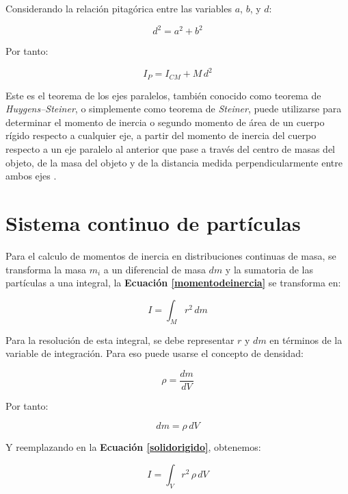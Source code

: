 \documentclass[letter,twoside,11pt]{article}
\begin{document}
Considerando la relación pitagórica entre las variables $a$, $b$, y $d$:

\begin{equation*}
    d^2 = a^2 + b^2
\end{equation*}

Por tanto:

\begin{equation}
    I_{P} = I_{CM} + M\, d^2
\end{equation}

Este es el teorema de los ejes paralelos, también conocido como teorema de 
\emph{Huygens–Steiner}, o simplemente como teorema de \emph{Steiner}, puede
utilizarse para determinar el momento de inercia o segundo momento de área de
un cuerpo rígido respecto a cualquier eje, a partir del momento de inercia del
cuerpo respecto a un eje paralelo al anterior que pase a través del centro de
masas del objeto, de la masa del objeto y de la distancia medida
perpendicularmente entre ambos ejes \cite{WIKI1}.

\section{Sistema continuo de partículas \cite{Sears}}

Para el calculo de momentos de inercia en distribuciones continuas de masa, se
transforma la masa $m_i$ a un diferencial de masa $dm$ y la sumatoria de las
partículas a una integral, la \textbf{Ecuación \ref{momentodeinercia}} se
transforma en:

\begin{equation}
    I = \int_{M} r^2\, dm
\label{solidorigido}
\end{equation}

Para la resolución de esta integral, se debe representar $r$ y $dm$ en términos
de la variable de integración. Para eso puede usarse el concepto de densidad:

\begin{equation}
    \rho = \frac{dm}{dV}
\label{densidad}
\end{equation}

Por tanto:

\begin{equation*}
    dm = \rho\, dV
\end{equation*}

Y reemplazando en la \textbf{Ecuación \ref{solidorigido}}, obtenemos:

\begin{equation*}
    I = \int_{V} r^2\, \rho\, dV
\end{equation*}
\end{document}
